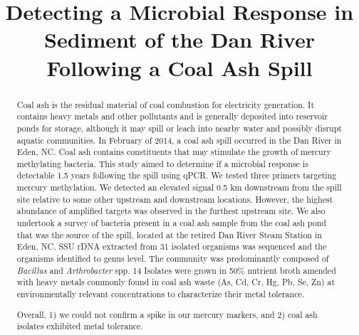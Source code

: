 \documentclass[ms, hidelinks]{uncgdissertationexp}
\title{Detecting a Microbial Response in Sediment of the Dan River Following a Coal Ash Spill}
\theoremstyle{plain}
\theoremstyle{definition}
\theoremstyle{remark}
\begin{document}
\frontmatter      %

\begin{abstract}
Coal ash is the residual material of coal combustion for electricity generation. It contains heavy metals and other pollutants and is generally deposited into reservoir ponds for storage, although it may spill or leach into nearby water and possibly disrupt aquatic communities. In February of 2014, a coal ash spill occurred in the Dan River in Eden, NC. Coal ash contains constituents that may stimulate the growth of mercury methylating bacteria. This study aimed to determine if a microbial response is detectable 1.5 years following the spill using qPCR. We tested three primers targeting mercury methylation. We detected an elevated signal 0.5 km downstream from the spill site relative to some other upstream and downstream locations. However, the highest abundance of amplified targets was observed in the furthest upstream site. We also undertook a survey of bacteria present in a coal ash sample from the coal ash pond that was the source of the spill, located at the retired Dan River Steam Station in Eden, NC. SSU rDNA extracted from 31 isolated organisms was sequenced and the organisms identified to genus level. The community was predominantly composed of \emph{Bacillus} and \emph{Arthrobacter} spp. 14 Isolates were grown in 50\% nutrient broth amended with heavy metals commonly found in coal ash waste (As, Cd, Cr, Hg, Pb, Se, Zn) at environmentally relevant concentrations to characterize their metal tolerance. 

Overall, 1) we could not confirm a spike in our mercury markers, and 2) coal ash isolates exhibited metal tolerance. 


\end{abstract}
\maketitlepage

\end{document}
